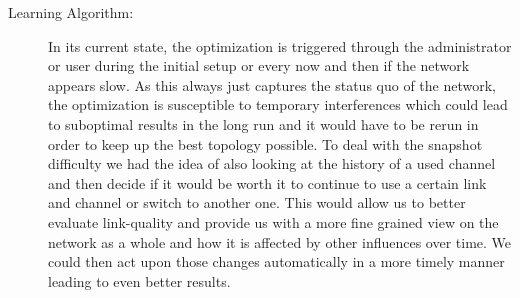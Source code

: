 \begin{description}
      \item[Learning Algorithm:]
	In its current state, the optimization is triggered through the administrator or user during the initial setup or every now and then if the network appears slow.
	As this always just captures the status quo of the network, the optimization is susceptible to
	temporary interferences which could lead to suboptimal results in the long run and it would have to be rerun in order to keep up the best topology possible.
	To deal with the snapshot difficulty we had the idea of also looking at the history of a used channel and then decide if it would be worth it to continue
	to use a certain link and channel or switch to another one. 
	This would allow us to better evaluate link-quality and provide us with a more fine
	grained view on the network as a whole and how it is affected by other influences over time. 
	We could then act upon those changes automatically in a more timely manner leading to even better results.
	
    \end{description}